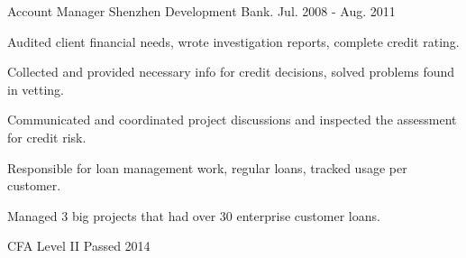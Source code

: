 \documentclass[11pt, a4paper]{awesome-cv}
\begin{document}
\begin{cventries}
  \cventry
    {Account Manager} %
    {Shenzhen Development Bank.} %
    {} %
    {Jul. 2008 - Aug. 2011} %
    {
      \begin{cvitems} %
        \item {Audited client financial needs, wrote investigation reports, complete credit rating.}
        \item {Collected and provided necessary info for credit decisions, solved problems found in vetting.}
        \item {Communicated and coordinated project discussions and inspected the assessment for credit risk.}
        \item {Responsible for loan management work, regular loans, tracked usage per customer.}
        \item {Managed 3 big projects that had over 30 enterprise customer loans.}
      \end{cvitems}
    }

\end{cventries}





\begin{cvhonors}

  \cvhonor
    {CFA Level II Passed} %
    {} %
    {} %
    {2014} %

\end{cvhonors}


\end{document}
